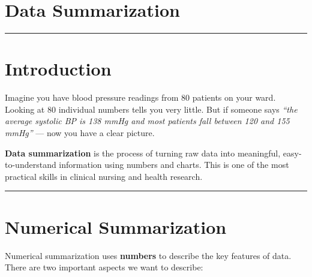 \documentclass[
  12pt,
  letterpaper,
]{book}
\begin{document}

\chapter{Data Summarization}\label{data-summarization}

\begin{center}\rule{0.5\linewidth}{0.5pt}\end{center}


\chapter*{Introduction}\label{introduction-1}


\begin{tcolorbox}[enhanced jigsaw, arc=.35mm, bottomrule=.15mm, bottomtitle=1mm, breakable, colback=white, colbacktitle=quarto-callout-note-color!10!white, colframe=quarto-callout-note-color-frame, coltitle=black, left=2mm, leftrule=.75mm, opacityback=0, opacitybacktitle=0.6, rightrule=.15mm, title={🏥 Why Does This Matter for Nurses?}, titlerule=0mm, toprule=.15mm, toptitle=1mm]

Imagine you have blood pressure readings from 80 patients on your ward.
Looking at 80 individual numbers tells you very little. But if someone
says \emph{``the average systolic BP is 138 mmHg and most patients fall
between 120 and 155 mmHg''} --- now you have a clear picture.

\textbf{Data summarization} is the process of turning raw data into
meaningful, easy-to-understand information using numbers and charts.
This is one of the most practical skills in clinical nursing and health
research.

\end{tcolorbox}

\begin{center}\rule{0.5\linewidth}{0.5pt}\end{center}


\chapter{Numerical Summarization}\label{numerical-summarization}

Numerical summarization uses \textbf{numbers} to describe the key
features of data. There are two important aspects we want to describe:
\end{document}
